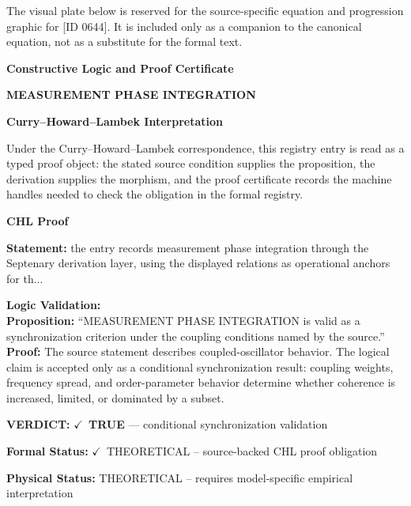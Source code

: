 \begingroup\footnotesize\sloppy
The visual plate below is reserved for the source-specific equation and progression graphic for [ID 0644]. It is included only as a companion to the canonical equation, not as a substitute for the formal text.
\par\endgroup
\ifTZPDarkEdition
{}
\fi

\clearpage
\begingroup\tzpsupportsetup
\noindent\textbf{\fontsize{10.8pt}{12.8pt}\selectfont [ID 0644] Constructive Logic and Proof Certificate}\par
\noindent\textbf{\fontsize{10pt}{12pt}\selectfont MEASUREMENT PHASE INTEGRATION}\par
\vspace{0.45em}
\begingroup
\footnotesize
\setlength{\parskip}{0.22em}
\setlength{\parindent}{0pt}
\noindent\textbf{Curry--Howard--Lambek Interpretation}\par
Under the Curry--Howard--Lambek correspondence, this registry entry is read as a typed proof
object: the stated source condition supplies the proposition, the derivation supplies the
morphism, and the proof certificate records the machine handles needed to check the obligation
in the formal registry.

\vspace{0.45em}
\noindent\textbf{CHL Proof}\par
\textbf{Statement:} the entry records measurement phase integration through the Septenary derivation layer,
using the displayed relations as operational anchors for th...

\textbf{Logic Validation:}\\
\textbf{Proposition:} ``MEASUREMENT PHASE INTEGRATION is valid as a synchronization criterion under the coupling
conditions named by the source.''\\
\textbf{Proof:} The source statement describes coupled-oscillator behavior. The logical claim is
accepted only as a conditional synchronization result: coupling weights, frequency
spread, and order-parameter behavior determine whether coherence is increased, limited,
or dominated by a subset.

\textbf{VERDICT:} \ensuremath{\checkmark}\ \textbf{TRUE} --- conditional synchronization validation

\textbf{Formal Status:} \ensuremath{\checkmark}\ THEORETICAL -- source-backed CHL proof obligation

\textbf{Physical Status:} THEORETICAL -- requires model-specific empirical interpretation
\par\vspace{0.45em}
\par
\ifTZPDarkEdition
{}
\fi
\endgroup
\endgroup
